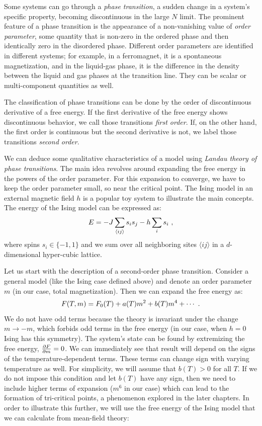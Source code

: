\par
Some systems can go through a \textit{phase transition}, a sudden change in a system's specific property, becoming discontinuous in the large $N$ limit. The prominent feature of a phase transition is the appearance of a non-vanishing value of \textit{order parameter}, some quantity that is non-zero in the ordered phase and then identically zero in the disordered phase. Different order parameters are identified in different systems; for example, in a ferromagnet, it is a spontaneous magnetization, and in the liquid-gas phase, it is the difference in the density between the liquid and gas phases at the transition line. They can be scalar or multi-component quantities as well. 
\par
The classification of phase transitions can be done by the order of discontinuous derivative of a free energy. If the first derivative of the free energy shows discontinuous behavior, we call those transitions \textit{first order}. If, on the other hand, the first order is continuous but the second derivative is not, we label those transitions \textit{second order}.
\par
We can deduce some qualitative characteristics of a model using \textit{Landau theory of phase transitions}. The main idea revolves around expanding the free energy in the powers of the order parameter. For this expansion to converge, we have to keep the order parameter small, so near the critical point. The Ising model in an external magnetic field $h$ is a popular toy system to illustrate the main concepts. The energy of the Ising model can be expressed as:
\begin{equation}
	E = -J \sum_{\langle i j \rangle} s_i s_j - h \sum_i s_i \ ,
	\label{eq:classicIsing}
\end{equation}
where spins $s_i \in \{-1,1\}$ and we sum over all neighboring sites $\langle i j \rangle$ in a $d$-dimensional hyper-cubic lattice.
\par
Let us start with the description of a second-order phase transition. Consider a general model (like the Ising case defined above) and denote an order parameter $m$ (in our case, total magnetization). Then we can expand the free energy as:
\begin{equation}
	F(T,m) = F_0 (T) + a(T) m^2 + b(T) m^4 + \cdots \ .
	\label{eq:landauexpansion}
\end{equation}
We do not have odd terms because the theory is invariant under the change $m\rightarrow -m$, which forbids odd terms in the free energy (in our case, when $h=0$ Ising has this symmetry). The system's state can be found by extremizing the free energy, $\pdv{F}{m}=0$. We can immediately see that result will depend on the signs of the temperature-dependent terms. These terms can change sign with varying temperature as well. For simplicity, we will assume that $b(T) > 0$ for all $T$. If we do not impose this condition and let $b(T)$ have any sign, then we need to include higher terms of expansion ($m^6$ in our case) which can lead to the formation of tri-critical points, a phenomenon explored in the later chapters. In order to illustrate this further, we will use the free energy of the Ising model that we can calculate from mean-field theory\cite{sachdev_2011}:
